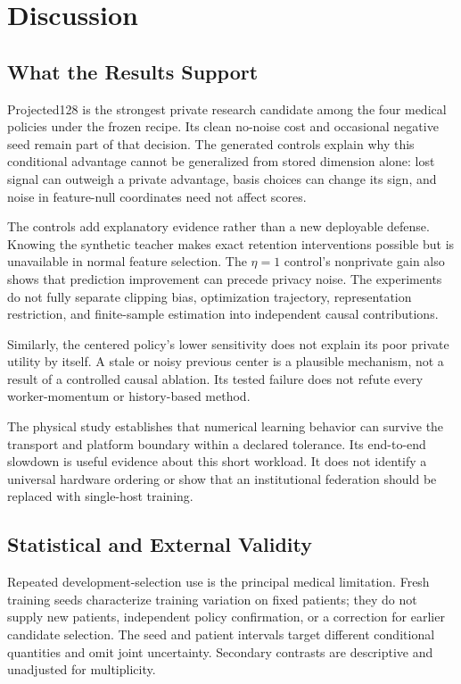 \documentclass[conference,letterpaper]{IEEEtran}
\begin{document}
\section{Discussion}
\subsection{What the Results Support}
Projected128 is the strongest private research candidate among the four medical policies under the frozen recipe. Its clean no-noise cost and occasional negative seed remain part of that decision. The generated controls explain why this conditional advantage cannot be generalized from stored dimension alone: lost signal can outweigh a private advantage, basis choices can change its sign, and noise in feature-null coordinates need not affect scores.

The controls add explanatory evidence rather than a new deployable defense. Knowing the synthetic teacher makes exact retention interventions possible but is unavailable in normal feature selection. The $\eta=1$ control's nonprivate gain also shows that prediction improvement can precede privacy noise. The experiments do not fully separate clipping bias, optimization trajectory, representation restriction, and finite-sample estimation into independent causal contributions.

Similarly, the centered policy's lower sensitivity does not explain its poor private utility by itself. A stale or noisy previous center is a plausible mechanism, not a result of a controlled causal ablation. Its tested failure does not refute every worker-momentum or history-based method.

The physical study establishes that numerical learning behavior can survive the transport and platform boundary within a declared tolerance. Its end-to-end slowdown is useful evidence about this short workload. It does not identify a universal hardware ordering or show that an institutional federation should be replaced with single-host training.

\subsection{Statistical and External Validity}
Repeated development-selection use is the principal medical limitation. Fresh training seeds characterize training variation on fixed patients; they do not supply new patients, independent policy confirmation, or a correction for earlier candidate selection. The seed and patient intervals target different conditional quantities and omit joint uncertainty. Secondary contrasts are descriptive and unadjusted for multiplicity.
\end{document}
